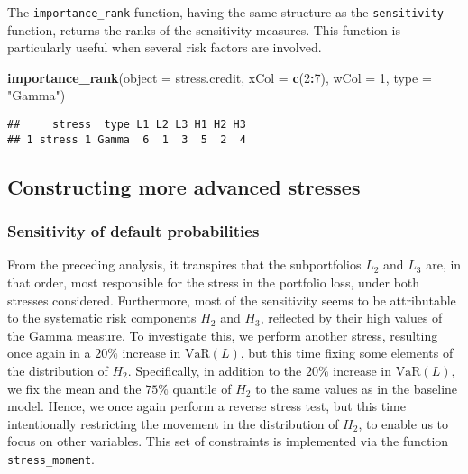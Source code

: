 \documentclass[
]{article}
\newenvironment{Shaded}{\begin{snugshade}}{\end{snugshade}}
\newcommand{\DataTypeTok}[1]{\textcolor[rgb]{0.13,0.29,0.53}{#1}}
\newcommand{\DecValTok}[1]{\textcolor[rgb]{0.00,0.00,0.81}{#1}}
\newcommand{\KeywordTok}[1]{\textcolor[rgb]{0.13,0.29,0.53}{\textbf{#1}}}
\newcommand{\NormalTok}[1]{#1}
\newcommand{\OperatorTok}[1]{\textcolor[rgb]{0.81,0.36,0.00}{\textbf{#1}}}
\newcommand{\StringTok}[1]{\textcolor[rgb]{0.31,0.60,0.02}{#1}}
\begin{document}
The \texttt{importance\_rank} function, having the same structure as the \texttt{sensitivity} function, returns the ranks of the sensitivity measures. This function is particularly useful when several risk factors are involved.

\begin{Shaded}
\begin{Highlighting}[]
\KeywordTok{importance_rank}\NormalTok{(}\DataTypeTok{object =}\NormalTok{ stress.credit, }\DataTypeTok{xCol =} \KeywordTok{c}\NormalTok{(}\DecValTok{2}\OperatorTok{:}\DecValTok{7}\NormalTok{), }\DataTypeTok{wCol =} \DecValTok{1}\NormalTok{, }\DataTypeTok{type =} \StringTok{"Gamma"}\NormalTok{)}
\end{Highlighting}
\end{Shaded}

\begin{verbatim}
##     stress  type L1 L2 L3 H1 H2 H3
## 1 stress 1 Gamma  6  1  3  5  2  4
\end{verbatim}

\hypertarget{constructing-more-advanced-stresses}{%
\subsection{Constructing more advanced stresses}\label{constructing-more-advanced-stresses}}

\hypertarget{sensitivity-of-default-probabilities}{%
\subsubsection{Sensitivity of default probabilities}\label{sensitivity-of-default-probabilities}}

From the preceding analysis, it transpires that the subportfolios \(L_2\) and \(L_3\) are, in that order, most responsible for the stress in the portfolio loss, under both stresses considered. Furthermore, most of the sensitivity seems to be attributable to the systematic risk components \(H_2\) and \(H_3\), reflected by their high values of the Gamma measure. To investigate this, we perform another stress, resulting once again in a \(20\%\) increase in \(\text{VaR}(L)\), but this time fixing some elements of the distribution of \(H_2\). Specifically, in addition to the \(20\%\) increase in \(\text{VaR}(L)\), we fix the mean and the \(75\%\) quantile of \(H_2\) to the same values as in the baseline model. Hence, we once again perform a reverse stress test, but this time intentionally restricting the movement in the distribution of \(H_2\), to enable us to focus on other variables. This set of constraints is implemented via the function \texttt{stress\_moment}.
\end{document}
